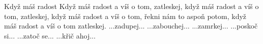 \begin{TEXT}{Když máš radost}
\SLOKA Když máš radost a víš o tom, zatleskej,
když máš radost a víš o tom, zatleskej,
když máš radost a víš o tom, 
řekni nám to aspoň potom,
když máš radost a víš o tom zatleskej.
\SLOKA ...zadupej...
\SLOKA ...zabouchej...
\SLOKA ...zamrkej...
\SLOKA ...poskoč si...
\SLOKA ...zatoč se...
\SLOKA ...křič ahoj...
\end{TEXT}